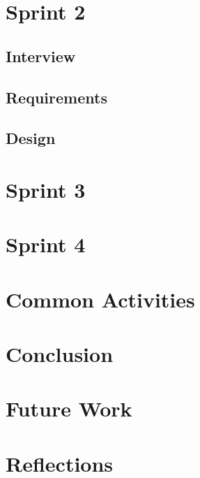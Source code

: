 \chapter{Sprint 2}


\newpage

\section{Interview}\label{s2interview}


\section{Requirements}\label{s2requirements}


\section{Design}










\chapter{Sprint 3}

\chapter{Sprint 4}

\chapter{Common Activities}

\chapter{Conclusion}


\chapter{Future Work}

\chapter{Reflections}

